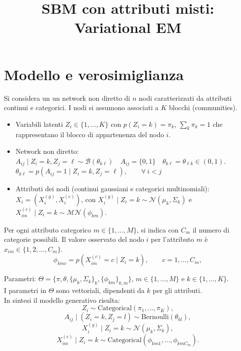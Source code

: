 \documentclass[11pt,a4paper]{article}
\title{SBM con attributi misti: Variational EM}
\author{}
\date{}
\begin{document}
\maketitle

\section{Modello e verosimiglianza}
Si considera un un network non diretto di $n$ nodi caratterizzati da attributi continui e categorici. I nodi si assumono associati a $K$ blocchi (communities). \\
\begin{itemize}
\item[-] Variabili latenti $Z_i\in\{1,\dots,K\}$ con $p(Z_i=k)=\pi_k$, $\sum_k\pi_k=1$ che rappresentano il blocco di appartenenza del nodo $i$. \\
\item[-] Network non diretto: $A_{ij} \mid Z_i=k,Z_j=\ell\sim\mathcal{B}(\theta_{k\ell}) \quad A_{ij}=\{0,1\} \quad \theta_{k\ell}=\theta_{\ell k}\in(0,1)$. $
\theta_{k\ell}=p(A_{ij}=1  \mid Z_i=k,Z_j=\ell),
\qquad
\forall \ i<j
$
\item[-] Attributi dei nodi (continui gaussiani e categorici multinomiali): $X_i=(X_i^{(g)},X_i^{(c)})$, con $X_i^{(g)}\mid Z_i=k\sim\mathcal{N}(\mu_k,\Sigma_k)$ e
$X^{(c)}_{im}\mid Z_i=k\sim\mathcal{MN}(\phi_{km})$.
\end{itemize}

Per ogni attributo categorico $m \in \{1,\dots,M\}$, si indica con $C_m$ il numero di categorie possibili. 
Il valore osservato del nodo $i$ per l'attributo $m$ è $x_{im} \in \{1,2,\dots,C_m\}$.
\[
\phi_{k m c} = p( X^{(c)}_{im} = c \mid Z_i = k),
\qquad
c = 1,\dots,C_m,
\]

\noindent Parametri: $\Theta=\{\pi,\theta,\{\mu_k,\Sigma_k\}_k,\{\phi_{km}\}_{k,m}\}$, $m\in\{1,\dots,M\}$ e $k\in\{1,\dots,K\}$.\\
I parametri in $\Theta$ sono vettoriali, dipendenti da $k$ per gli attributi.\\

In sintesi il modello generativo risulta:
\[
Z_i \sim \text{Categorical}(\pi_1,\dots,\pi_K),
\]
\[
A_{ij} \mid (Z_i=k,Z_j=l) \sim \text{Bernoulli}(\theta_{kl}),
\]
\[
X^{(g)}_i \mid Z_i=k \sim \mathcal{N}(\mu_k,\Sigma_k),
\]
\[
X^{(c)}_{im} \mid Z_i=k \sim \text{Categorical}(\phi_{km1},\dots,\phi_{kmC_m}).
\]
\end{document}
